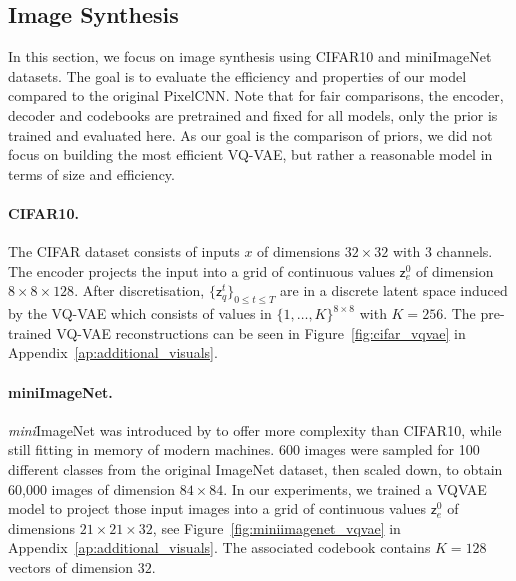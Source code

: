 \documentclass[nohyperref]{article}
\theoremstyle{plain}
\theoremstyle{definition}
\theoremstyle{remark}
\newcommand{\latentcont}{\mathsf{z}_e}
\newcommand{\latentdis}{\mathsf{z}_q}
\begin{document}

\subsection{Image Synthesis}
In this section, we focus on image synthesis using CIFAR10 and miniImageNet datasets. The goal is to evaluate the efficiency and properties of our model compared to the original PixelCNN. Note that for fair comparisons, the encoder, decoder and codebooks are pretrained and fixed for all models, only the prior is trained and evaluated here. As our goal is the comparison of priors, we did not focus on building the most efficient VQ-VAE, but rather a reasonable model in terms of size and efficiency.

\paragraph{CIFAR10. }
 The CIFAR dataset consists of inputs $x$ of dimensions $32 \times 32$ with 3 channels. The encoder projects the input into a grid of continuous values $\latentcont^0$ of dimension $8 \times 8 \times 128$. After discretisation, $\{\latentdis^t\}_{0\leqslant t\leqslant T}$ are in a discrete latent space induced by the VQ-VAE which consists of values in $\{1,\ldots,K\}^{8 \times 8}$ with $K=256$. The pre-trained VQ-VAE reconstructions can be seen in Figure~\ref{fig:cifar_vqvae} in Appendix~\ref{ap:additional_visuals}.

\paragraph{miniImageNet. }
\textit{mini}ImageNet was introduced by \cite{Vinyals2016MatchingNF} to offer more complexity than CIFAR10, while still fitting in memory of modern machines.
600 images were sampled for 100 different classes from the original ImageNet dataset, then scaled down, to obtain 60,000 images of dimension $84 \times 84$.
In our experiments, we trained a VQVAE model to project those input images into a grid of continuous values $\latentcont^0$ of dimensions $21 \times 21 \times 32$, see Figure~\ref{fig:miniimagenet_vqvae} in Appendix~\ref{ap:additional_visuals}.
The associated codebook contains $K=128$ vectors of dimension $32$. 
\end{document}
